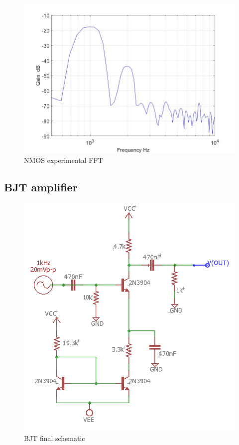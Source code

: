 \begin{figure}[H]
	\centering
	\includegraphics[width=0.7\linewidth]{ExperimentalImplementation/nmos_fft.jpg}
	\caption{NMOS experimental FFT}
	\label{fig:nmosexp}
\end{figure}




\subsection{BJT amplifier}


\begin{figure}[H]
	\centering
	\includegraphics[width=0.7\linewidth]{ExperimentalImplementation/BJT_Exp}
	\caption{BJT final schematic}
	\label{fig:bjtexp}
\end{figure}



